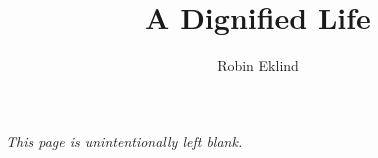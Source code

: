 \documentclass[12pt, a4paper]{article}
\title{A Dignified Life}
\author{Robin Eklind}
\begin{document}



\maketitle

\clearpage





\tableofcontents

\clearpage



\thispagestyle{empty}

\vspace*{2.5cm}

\begin{center}
	\textit{This page is unintentionally left blank.}
\end{center}

\clearpage




\end{document}

